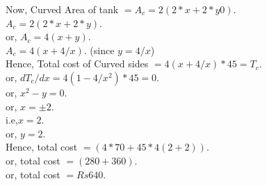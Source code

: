 \documentclass[tikz,border=2pt,png]{article}
\begin{document}
\begin{itemize}
Now, Curved Area of tank $=A_c=2(2*x+2*y0)$.\\

 \hspace{0.8 cm}$A_c=2(2*x+2*y)$.\\

or, \hspace{0.8 cm}$A_c=4(x+y)$.\\

\hspace{0.8 cm}$A_c=4(x+4/x)$. \hspace{3 cm}(since $y=4/x$)\\

Hence, Total cost of Curved sides $=4(x+4/x)*45=T_c$.\\

or, \hspace{0.8 cm}$dT_c/dx=4(1-4/x^2)*45=0$.\\

or, \hspace{0.8 cm}$x^2-y=0$.\\

or, \hspace{0.8 cm}$x=\pm2$.\\

i.e,\hspace{0.8 cm}$x=2$.\\

or, \hspace{0.8 cm}$y=2$.\\

Hence, total cost $=(4*70+45*4(2+2))$.\\

or, \hspace{0.8 cm}total cost $=(280+360)$.\\
 
or, \hspace{0.8 cm}total cost $=Rs  640$.\\
\end{itemize}
\end{document}

